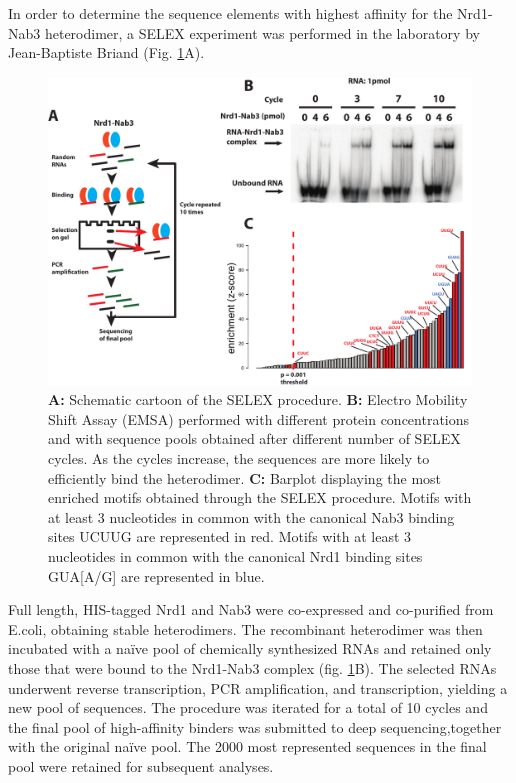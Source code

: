In order to determine the sequence elements with highest affinity for the Nrd1-Nab3 heterodimer, a SELEX experiment was performed in the laboratory by Jean-Baptiste Briand (Fig. \ref{fig:selex}A). 

\begin{figure}[h]

\centering
\includegraphics[width=\textwidth]{figures/results/selex}
\caption[SELEX procedure]{\textbf{A: }Schematic cartoon of the SELEX procedure. \textbf{B: }Electro Mobility Shift Assay (EMSA) performed with different protein concentrations and with sequence pools obtained after different number of SELEX cycles. As the cycles increase, the sequences are more likely to efficiently bind the heterodimer. \textbf{C: } Barplot displaying the most enriched motifs obtained through the SELEX procedure. Motifs with at least 3 nucleotides in common with the canonical Nab3 binding sites UCUUG are represented in red. Motifs with at least 3 nucleotides in common with the canonical Nrd1 binding sites GUA[A/G] are represented in blue.}
\label{fig:selex}

\end{figure} 

Full length, HIS-tagged Nrd1 and Nab3 were co-expressed and co-purified from E.coli, obtaining stable heterodimers. The recombinant heterodimer was then incubated with a naïve pool of chemically synthesized RNAs and retained only those that were bound to the Nrd1-Nab3 complex (fig. \ref{fig:selex}B). 
The selected RNAs underwent reverse transcription, PCR amplification, and \invitro{} transcription, yielding a new pool of sequences. The procedure was iterated for a total of 10 cycles and the final pool of high-affinity binders was submitted to deep sequencing,together with the original naïve pool. The 2000 most represented sequences in the final pool were retained for subsequent analyses. 



